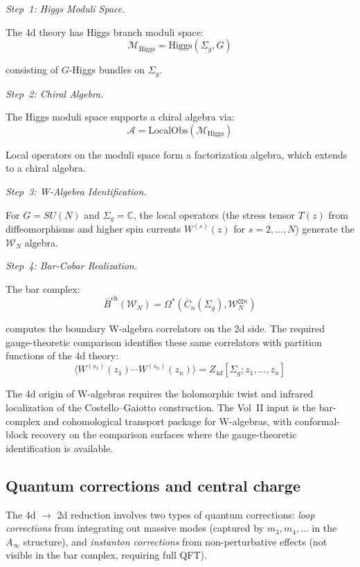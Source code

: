 \begin{evidence}
\emph{Step~1: Higgs Moduli Space.}

The 4d theory has Higgs branch moduli space:
\[\mathcal{M}_{\text{Higgs}} = \text{Higgs}(\Sigma_g, G)\]

consisting of $G$-Higgs bundles on $\Sigma_g$.

\emph{Step~2: Chiral Algebra.}

The Higgs moduli space supports a chiral algebra via:
\[\mathcal{A} = \text{LocalObs}(\mathcal{M}_{\text{Higgs}})\]

Local operators on the moduli space form a factorization algebra, which extends
to a chiral algebra.

\emph{Step~3: W-Algebra Identification.}

For $G = SU(N)$ and $\Sigma_g = \mathbb{C}$, the local operators (the stress tensor $T(z)$ from diffeomorphisms and higher spin currents $W^{(s)}(z)$ for $s = 2, \ldots, N$) generate the $\mathcal{W}_N$ algebra.

\emph{Step~4: Bar-Cobar Realization.}

The bar complex:
\[\bar{B}^{\text{ch}}(\mathcal{W}_N) = \Omega^*(\overline{C}_n(\Sigma_g),
\mathcal{W}_N^{\boxtimes n})\]

computes the boundary W-algebra correlators on the 2d side. The
required gauge-theoretic comparison identifies these same correlators
with partition functions of the 4d theory:
\[\langle W^{(s_1)}(z_1) \cdots W^{(s_n)}(z_n) \rangle =
Z_{4d}[\Sigma_g; z_1, \ldots, z_n]\]
\end{evidence}

\begin{remark}
The 4d origin of W-algebras requires the holomorphic twist and
infrared localization of the Costello--Gaiotto construction. The
Vol~II input is the bar-complex and cohomological transport package
for W-algebras, with conformal-block recovery on the comparison
surfaces where the gauge-theoretic identification is available.
\end{remark}

\subsection{Quantum corrections and central charge}

\begin{remark}
The 4d $\to$ 2d reduction involves two types of quantum corrections: \emph{loop corrections} from integrating out massive modes (captured by $m_3, m_4, \ldots$ in the $A_\infty$ structure), and \emph{instanton corrections} from non-perturbative effects (not visible in the bar complex, requiring full QFT).
\end{remark}

